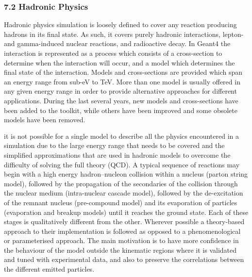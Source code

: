 \documentclass[12pt,a4paper]{article}
\begin{document}
\hypertarget{hadronic-physics}{%
\subsubsection{7.2 Hadronic Physics}\label{hadronic-physics}}

Hadronic physics simulation is loosely defined to cover any reaction
producing hadrons in its final state. As such, it covers purely hadronic
interactions, lepton- and gamma-induced nuclear reactions, and
radioactive decay. In Geant4 the interaction is represented as a process
which consists of a cross-section to determine when the interaction will
occur, and a model which determines the final state of the interaction.
Models and cross-sections are provided which span an energy range from
sub-eV to TeV. More than one model is usually offered in any given
energy range in order to provide alternative approaches for different
applications. During the last several years, new models and
cross-sections have been added to the toolkit, while others have been
improved and some obsolete models have been removed.

it is not possible for a single model to describe all the physics
encountered in a simulation due to the large energy range that needs to
be covered and the simplified approximations that are used in hadronic
models to overcome the difficulty of solving the full theory (QCD). A
typical sequence of reactions may begin with a high energy
hadron--nucleon collision within a nucleus (parton string model),
followed by the propagation of the secondaries of the collision through
the nuclear medium (intra-nuclear cascade model), followed by the
de-excitation of the remnant nucleus (pre-compound model) and its
evaporation of particles (evaporation and breakup models) until it
reaches the ground state. Each of these stages is qualitatively
different from the other. Wherever possible a theory-based approach to
their implementation is followed as opposed to a phenomenological or
parameterised approach. The main motivation is to have more confidence
in the behaviour of the model outside the kinematic regions where it is
validated and tuned with experimental data, and also to preserve the
correlations between the different emitted particles.
\end{document}
